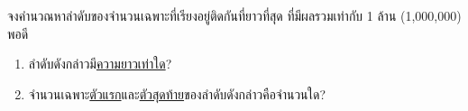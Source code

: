 \question{}

จงคำนวณหาลำดับของจำนวนเฉพาะที่เรียงอยู่ติดกันที่ยาวที่สุด
ที่มีผลรวมเท่ากับ 1 ล้าน (1,000,000) พอดี
\begin{enumerate}
    \item ลำดับดังกล่าวมี\uline{ความยาวเท่าใด}? 
    \item จำนวนเฉพาะ\uline{ตัวแรก}และ\uline{ตัวสุดท้าย}ของลำดับดังกล่าวคือจำนวนใด?
\end{enumerate}
